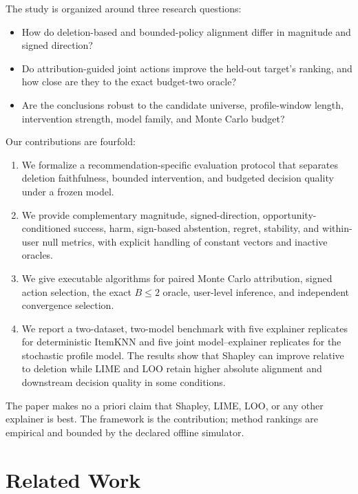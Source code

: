 \documentclass[pdflatex,sn-mathphys-num]{sn-jnl}
\begin{document}
The study is organized around three research questions:
\begin{itemize}
  \item[\textbf{RQ1}] How do deletion-based and bounded-policy alignment differ in magnitude and signed direction?
  \item[\textbf{RQ2}] Do attribution-guided joint actions improve the held-out target's ranking, and how close are they to the exact budget-two oracle?
  \item[\textbf{RQ3}] Are the conclusions robust to the candidate universe, profile-window length, intervention strength, model family, and Monte Carlo budget?
\end{itemize}

Our contributions are fourfold:
\begin{enumerate}
  \item We formalize a recommendation-specific evaluation protocol that separates deletion faithfulness, bounded intervention, and budgeted decision quality under a frozen model.
  \item We provide complementary magnitude, signed-direction, opportunity-conditioned success, harm, sign-based abstention, regret, stability, and within-user null metrics, with explicit handling of constant vectors and inactive oracles.
  \item We give executable algorithms for paired Monte Carlo attribution, signed action selection, the exact $B\le2$ oracle, user-level inference, and independent convergence selection.
  \item We report a two-dataset, two-model benchmark with five explainer replicates for deterministic ItemKNN and five joint model--explainer replicates for the stochastic profile model. The results show that Shapley can improve relative to deletion while LIME and LOO retain higher absolute alignment and downstream decision quality in some conditions.
\end{enumerate}

The paper makes no a priori claim that Shapley, LIME, LOO, or any other explainer is best. The framework is the contribution; method rankings are empirical and bounded by the declared offline simulator.



\section{Related Work}
\end{document}
